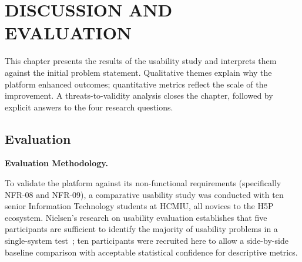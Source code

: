 \chapter{DISCUSSION AND EVALUATION}
\label{ch:discussion}

This chapter presents the results of the usability study and interprets them against the initial problem statement. Qualitative themes explain why the platform enhanced outcomes; quantitative metrics reflect the scale of the improvement. A threats-to-validity analysis closes the chapter, followed by explicit answers to the four research questions.

\section{Evaluation}

\textbf{Evaluation Methodology.}

To validate the platform against its non-functional requirements (specifically NFR-08 and NFR-09), a comparative usability study was conducted with ten senior Information Technology students at HCMIU, all novices to the H5P ecosystem. Nielsen's research on usability evaluation establishes that five participants are sufficient to identify the majority of usability problems in a single-system test~\cite{nielsen1994}; ten participants were recruited here to allow a side-by-side baseline comparison with acceptable statistical confidence for descriptive metrics.

